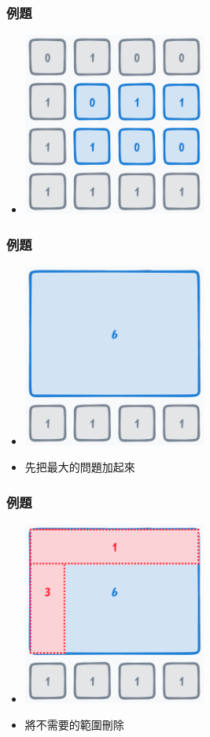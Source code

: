 \documentclass[mathserif]{beamer}
\begin{document}
\begin{frame}
    \frametitle{例題}
    \begin{itemize}
        \item \includegraphics[width=6.0cm]{img/6-6.png}
    \end{itemize}
\end{frame}

\begin{frame}
    \frametitle{例題}
    \begin{itemize}
        \item \includegraphics[width=6.0cm]{img/6-7.png}
        \item 先把最大的問題加起來
    \end{itemize}
\end{frame}

\begin{frame}
    \frametitle{例題}
    \begin{itemize}
        \item \includegraphics[width=6.0cm]{img/6-8.png}
        \item 將不需要的範圍刪除
    \end{itemize}
\end{frame}
\end{document}
